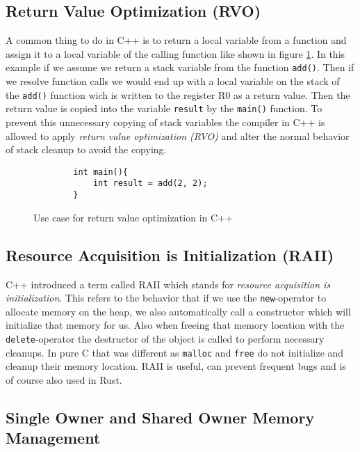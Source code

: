         \subsection{Return Value Optimization (RVO)}

        A common thing to do in C++ is to return a local variable from a function and assign it to a local variable of the calling function like shown in figure \ref{fig:rvo}. In this example if we assume we return a stack variable from the function \lstinline{add()}. Then if we resolve function calls we would end up with a local variable on the stack of the \lstinline{add()} function wich is written to the register R0 as a return value. Then the return value is copied into the variable \lstinline{result} by the \lstinline{main()} function. To prevent this unnecessary copying of stack variables the compiler in C++ is allowed to apply \textit{return value optimization (RVO)} and alter the normal behavior of stack cleanup to avoid the copying.

\begin{figure}[h]
    \begin{lstlisting}
        int main(){
            int result = add(2, 2);
        }
    \end{lstlisting}
    \caption{Use case for return value optimization in C++}
    \label{fig:rvo}
\end{figure}

\subsection{Resource Acquisition is Initialization (RAII)}

C++ introduced a term called RAII which stands for \textit{resource acquisition is initialization}. This refers to the behavior that if we use the \lstinline{new}-operator to allocate memory on the heap, we also automatically call a constructor which will initialize that memory for us. Also when freeing that memory location with the \lstinline{delete}-operator the destructor of the object is called to perform necessary cleanups. In pure C that was different as \lstinline{malloc} and \lstinline{free} do not initialize and cleanup their memory location. RAII is useful, can prevent frequent bugs and is of course also used in Rust.

\subsection{Single Owner and Shared Owner Memory Management}


